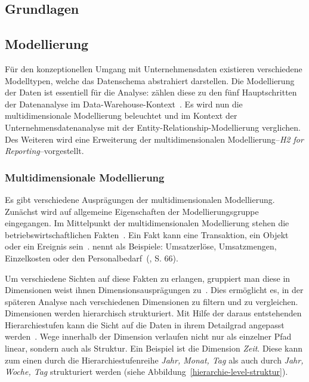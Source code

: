 \documentclass[
  language=german, %
  type=bachelor,%
  ngerman
]{isthesis}
\begin{document}
\begin{content}
  \chapter{Grundlagen}\label{ch:grundlagen}
  

  \section{Modellierung}

  Für den konzeptionellen Umgang mit Unternehmensdaten existieren verschiedene
  Modelltypen, welche das Datenschema abstrahiert darstellen.  Die Modellierung
  der Daten ist essentiell für die Analyse:
  \textsc{\citeauthor{phipps2002automating}} zählen diese zu den fünf
  Hauptschritten der Datenanalyse im Data-Warehouse-Kontext~\cite[][S.
  1]{phipps2002automating}. Es wird nun die multidimensionale Modellierung
  beleuchtet und im Kontext der Unternehmensdatenanalyse mit der
  Entity-Relationship-Modellierung verglichen. Des Weiteren wird eine
  Erweiterung der multidimensionalen Modellierung--\textit{H2 for
  Reporting}--vorgestellt.


  \subsection{Multidimensionale
  Modellierung}\label{subsec:multidimensionale-modellierung} 

  Es gibt verschiedene Ausprägungen der multidimensionalen Modellierung.
  Zunächst wird auf allgemeine Eigenschaften der Modellierungsgruppe
  eingegangen. Im Mittelpunkt der multidimensionalen Modellierung stehen die
  betriebswirtschaftlichen Fakten~\cite[][S.  2]{phipps2002automating}. Ein
  Fakt kann eine Transaktion, ein Objekt oder ein Ereignis sein~\cite[][S.
  42]{ballard1998data}. \textsc{\citeauthor{Kemper2010}} nennt als Beispiele:
  \glqq{}Umsatzerlöse, Umsatzmengen, Einzelkosten oder den
  Personalbedarf\grqq{}~(\citeyear{Kemper2010}, S. 66). 

  Um verschiedene Sichten auf diese Fakten zu erlangen, gruppiert man diese in
  Dimensionen \bzw{} weist ihnen Dimensionsausprägungen zu~\cite[][S.
  66]{Kemper2010}. Dies ermöglicht es, in der späteren Analyse nach
  verschiedenen Dimensionen zu filtern und zu vergleichen. Dimensionen werden
  hierarchisch strukturiert. Mit Hilfe der daraus entstehenden Hierarchiestufen
  kann die Sicht auf die Daten in ihrem Detailgrad angepasst werden~\cite[][S.
  66]{Kemper2010}. Wege innerhalb der Dimension verlaufen nicht nur als
  einzelner Pfad linear, sondern auch als Struktur. Ein Beispiel ist die
  Dimension \textit{Zeit}.  Diese kann zum einen durch die
  Hierarchiestufenreihe \textit{Jahr, Monat, Tag} als auch durch \textit{Jahr,
  Woche, Tag} strukturiert werden (siehe
  Abbildung~\ref{hierarchie-level-struktur}).


\end{content}
\end{document}
